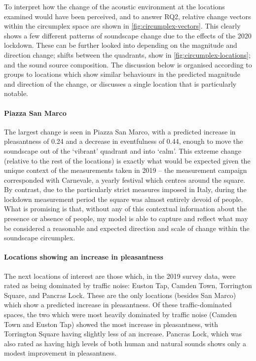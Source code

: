 
   To interpret how the change of the acoustic environment at the locations examined would have been perceived, and to answer RQ2, relative change vectors within the circumplex space are shown in \cref{fig:circumplex-vectors}. This clearly shows a few different patterns of soundscape change due to the effects of the 2020 lockdown. These can be further looked into depending on the magnitude and direction change; shifts between the quadrants, show in \cref{fig:circumplex-locations}; and the sound source composition. The discussion below is organised according to groups to locations which show similar behaviours in the predicted magnitude and direction of the change, or discusses a single location that is particularly notable.

   \paragraph{Piazza San Marco} The largest change is seen in Piazza San Marco, with a predicted increase in pleasantness of 0.24 and a decrease in eventfulness of 0.44, enough to move the soundscape out of the `vibrant' quadrant and into `calm'. This extreme change (relative to the rest of the locations) is exactly what would be expected given the unique context of the measurements taken in 2019 -- the measurement campaign corresponded with Carnevale, a yearly festival which centres around the square. By contrast, due to the particularly strict measures imposed in Italy, during the lockdown measurement period the square was almost entirely devoid of people. What is promising is that, without any of this contextual information about the presence or absence of people, my model is able to capture and reflect what may be considered a reasonable and expected direction and scale of change within the soundscape circumplex.

   \paragraph{Locations showing an increase in pleasantness} The next locations of interest are those which, in the 2019 survey data, were rated as being dominated by traffic noise: Euston Tap, Camden Town, Torrington Square, and Pancras Lock. These are the only locations (besides San Marco) which show a predicted increase in pleasantness. Of these traffic-dominated spaces, the two which were most heavily dominated by traffic noise (Camden Town and Euston Tap) showed the most increase in pleasantness, with Torrington Square having slightly less of an increase. Pancras Lock, which was also rated as having high levels of both human and natural sounds shows only a modest improvement in pleasantness.

